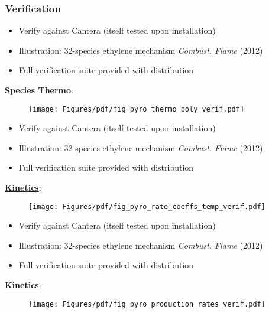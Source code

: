 \documentclass{beamer}
\begin{document}
\begin{frame}\frametitle{Verification}

  \begin{overprint}
    \begin{itemize}
    \item Verify against Cantera (itself tested upon installation)
    \item Illustration: 32-species ethylene mechanism \tiny{ \textit{Combust. Flame} (2012)}\normalsize
    \item Full verification suite provided with distribution
    \end{itemize}
    
    \textcolor{myOrange}{\underline{\textbf{\textrm{Species Thermo}}}}:
    \begin{figure}[H]
      \begin{center}
        \texttt{[image: Figures/pdf/fig\_pyro\_thermo\_poly\_verif.pdf]}
      \end{center}
    \end{figure}

    \begin{itemize}
    \item Verify against Cantera (itself tested upon installation)
    \item Illustration: 32-species ethylene mechanism \tiny{ \textit{Combust. Flame} (2012)}\normalsize
    \item Full verification suite provided with distribution
    \end{itemize}
    
    \textcolor{myOrange}{\underline{\textbf{\textrm{Kinetics}}}}:
    \begin{figure}[H]
      \begin{center}
        \texttt{[image: Figures/pdf/fig\_pyro\_rate\_coeffs\_temp\_verif.pdf]}
      \end{center}
    \end{figure}

    \begin{itemize}
    \item Verify against Cantera (itself tested upon installation)
    \item Illustration: 32-species ethylene mechanism \tiny{ \textit{Combust. Flame} (2012)}\normalsize
    \item Full verification suite provided with distribution
    \end{itemize}

    \textcolor{myOrange}{\underline{\textbf{\textrm{Kinetics}}}}:
    \begin{figure}[H]
      \begin{center}
        \texttt{[image: Figures/pdf/fig\_pyro\_production\_rates\_verif.pdf]}
      \end{center}
    \end{figure}

  \end{overprint}
  
\end{frame}
\end{document}
